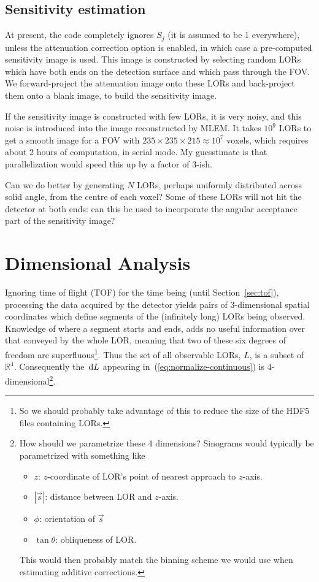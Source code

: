\documentclass[10pt, a4paper, twocolumn]{article} %
\newcommand\dd[1]  { \,\textrm d{#1} }   %
\begin{document}
\subsection{Sensitivity estimation}

At present, the code completely ignores \(S_{j}\) (it is assumed to be 1
everywhere), unless the attenuation correction option is enabled, in which case
a pre-computed sensitivity image is used. This image is constructed by selecting
random LORs which have both ends on the detection surface and which pass through
the FOV\@. We forward-project the attenuation image onto these LORs and
back-project them onto a blank image, to build the sensitivity image.

If the sensitivity image is constructed with few LORs, it is very noisy, and
this noise is introduced into the image reconstructed by MLEM\@. It takes
\(10^{9}\) LORs to get a smooth image for a FOV with
\(235 \times 235 \times 215 \approx 10^{7}\) voxels, which requires about 2
hours of computation, in serial mode. My guesstimate is that parallelization
would speed this up by a factor of 3-ish.

Can we do better by generating \(N\) LORs, perhaps uniformly distributed across
solid angle, from the centre of each voxel? Some of these LORs will not hit the
detector at both ends: can this be used to incorporate the angular acceptance
part of the sensitivity image?


\section{Dimensional Analysis}

Ignoring time of flight (TOF) for the time being (until Section~\ref{sec:tof}),
processing the data acquired by the detector yields pairs of 3-dimensional
spatial coordinates which define segments of the (infinitely long) LORs being
observed. Knowledge of where a segment starts and ends, adds no useful
information over that conveyed by the whole LOR, meaning that two of these six
degrees of freedom are superfluous\footnote{So we should probably take advantage
  of this to reduce the size of the HDF5 files containing LORs.}. Thus the set of
all observable LORs, \(L\), is a subset of \(\mathbb{R}^{4}\). Consequently the
\(\dd L\) appearing in~(\ref{eq:normalize-continuous}) is
4-dimensional\footnote{How should we parametrize these 4 dimensions? Sinograms
  would typically be parametrized with something like
  \begin{itemize}
  \item \(z\): \(z\)-coordinate of LOR's point of nearest approach to \(z\)-axis.
  \item \(|\vec{s}|\): distance between LOR and \(z\)-axis.
  \item \(\phi\): orientation of \(\vec{s}\)
  \item \(\tan \theta\): obliqueness of LOR\@.
  \end{itemize}
  This would then probably match the binning scheme we would use when estimating
  additive corrections. }.
\end{document}
